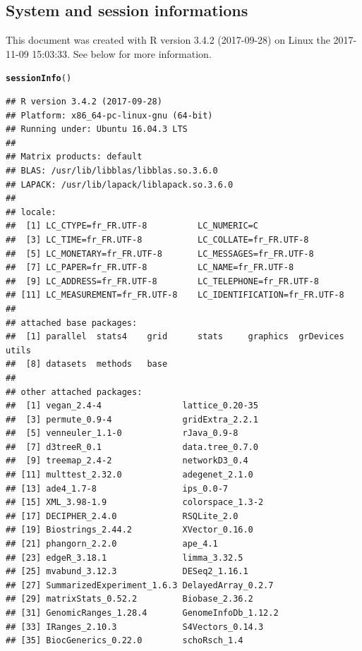 \documentclass[12pt]{article}\usepackage[]{graphicx}\usepackage[]{color}
\makeatletter
\newcommand{\hlstd}[1]{\textcolor[rgb]{0.345,0.345,0.345}{#1}}%
\newcommand{\hlkwd}[1]{\textcolor[rgb]{0.737,0.353,0.396}{\textbf{#1}}}%
\newenvironment{kframe}{%
 \def\at@end@of@kframe{}%
 \ifinner\ifhmode%
  \def\at@end@of@kframe{\end{minipage}}%
  \begin{minipage}{\columnwidth}%
 \fi\fi%
 \def\FrameCommand##1{\hskip\@totalleftmargin \hskip-\fboxsep
 \colorbox{shadecolor}{##1}\hskip-\fboxsep
     \hskip-\linewidth \hskip-\@totalleftmargin \hskip\columnwidth}%
 \MakeFramed {\advance\hsize-\width
   \@totalleftmargin\z@ \linewidth\hsize
   \@setminipage}}%
 {\par\unskip\endMakeFramed%
 \at@end@of@kframe}
\newenvironment{knitrout}{}{} %
\numberwithin{figure}{section}
\makeatother
\begin{document}
  \subsection{System and session informations}
  This document was created with R version 3.4.2 (2017-09-28) on Linux the 2017-11-09 15:03:33. See below for more information.
\begin{knitrout}\tiny
{}\color{fgcolor}\begin{kframe}
\begin{alltt}
\hlkwd{sessionInfo}\hlstd{()}
\end{alltt}
\begin{verbatim}
## R version 3.4.2 (2017-09-28)
## Platform: x86_64-pc-linux-gnu (64-bit)
## Running under: Ubuntu 16.04.3 LTS
## 
## Matrix products: default
## BLAS: /usr/lib/libblas/libblas.so.3.6.0
## LAPACK: /usr/lib/lapack/liblapack.so.3.6.0
## 
## locale:
##  [1] LC_CTYPE=fr_FR.UTF-8          LC_NUMERIC=C                 
##  [3] LC_TIME=fr_FR.UTF-8           LC_COLLATE=fr_FR.UTF-8       
##  [5] LC_MONETARY=fr_FR.UTF-8       LC_MESSAGES=fr_FR.UTF-8      
##  [7] LC_PAPER=fr_FR.UTF-8          LC_NAME=fr_FR.UTF-8          
##  [9] LC_ADDRESS=fr_FR.UTF-8        LC_TELEPHONE=fr_FR.UTF-8     
## [11] LC_MEASUREMENT=fr_FR.UTF-8    LC_IDENTIFICATION=fr_FR.UTF-8
## 
## attached base packages:
##  [1] parallel  stats4    grid      stats     graphics  grDevices utils    
##  [8] datasets  methods   base     
## 
## other attached packages:
##  [1] vegan_2.4-4                lattice_0.20-35           
##  [3] permute_0.9-4              gridExtra_2.2.1           
##  [5] venneuler_1.1-0            rJava_0.9-8               
##  [7] d3treeR_0.1                data.tree_0.7.0           
##  [9] treemap_2.4-2              networkD3_0.4             
## [11] multtest_2.32.0            adegenet_2.1.0            
## [13] ade4_1.7-8                 ips_0.0-7                 
## [15] XML_3.98-1.9               colorspace_1.3-2          
## [17] DECIPHER_2.4.0             RSQLite_2.0               
## [19] Biostrings_2.44.2          XVector_0.16.0            
## [21] phangorn_2.2.0             ape_4.1                   
## [23] edgeR_3.18.1               limma_3.32.5              
## [25] mvabund_3.12.3             DESeq2_1.16.1             
## [27] SummarizedExperiment_1.6.3 DelayedArray_0.2.7        
## [29] matrixStats_0.52.2         Biobase_2.36.2            
## [31] GenomicRanges_1.28.4       GenomeInfoDb_1.12.2       
## [33] IRanges_2.10.3             S4Vectors_0.14.3          
## [35] BiocGenerics_0.22.0        schoRsch_1.4              

\end{verbatim}
\end{kframe}
\end{knitrout}
\end{document}
